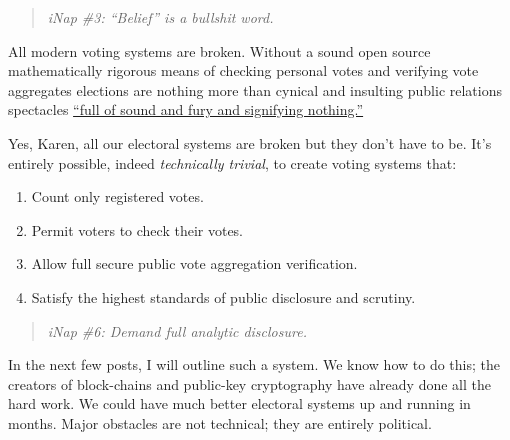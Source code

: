 \begin{quote}
\emph{iNap \#3: ``Belief'' is a bullshit word.}
\end{quote}

All modern voting systems are broken. Without a sound open source
mathematically rigorous means of checking personal votes and verifying
vote aggregates elections are nothing more than cynical and insulting
public relations spectacles
\href{https://www.poetryfoundation.org/poems/56964/speech-tomorrow-and-tomorrow-and-tomorrow}{``full
of sound and fury and signifying nothing.''}

Yes, Karen, all our electoral systems are broken but they don't have to
be. It's entirely possible, indeed \emph{technically trivial}, to create
voting systems that:

\begin{enumerate}
\def\labelenumi{\arabic{enumi}.}
\tightlist
\item
  Count only registered votes.
\item
  Permit voters to check their votes.
\item
  Allow full secure public vote aggregation verification.
\item
  Satisfy the highest standards of public disclosure and scrutiny.
\end{enumerate}

\begin{quote}
\emph{iNap \#6: Demand full analytic disclosure.}
\end{quote}

In the next few posts, I will outline such a system. We know how to do
this; the creators of block-chains and public-key cryptography have
already done all the hard work. We could have much better electoral
systems up and running in months. Major obstacles are not technical;
they are entirely political.



%
